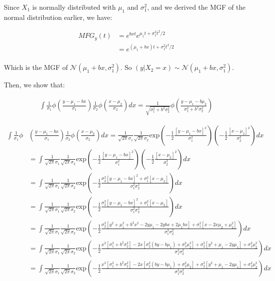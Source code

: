 \documentclass[11pt]{article}
\begin{document}
Since $X_1$ is normally distributed with $\mu_1$ and $\sigma^2_1$, and we derived the MGF of the normal distribution earlier, we have: 

\begin{align*}
    MFG_y(t) &= e^{bxt}e^{\mu_1t + \sigma_1^2t^2/2}\\
    &= e^{(\mu_1 + bx)t + \sigma_1^2t^2/2}\\
\end{align*}

Which is the MGF of $\mathcal{N}(\mu_1 + bx, \sigma^2_1)$. So $(y|X_2=x) \sim \mathcal{N}(\mu_1 + bx, \sigma^2_1) $.

Then, we show that:

\begin{align*}
    \int \frac{1}{\sigma_1} \phi \left( \frac{y-\mu_1-bx}{\sigma_1}\right)  \frac{1}{\sigma_2} \phi \left( \frac{x-\mu_2}{\sigma_2}\right)dx = \frac{1}{\sqrt{\sigma^2_1+b^2\sigma^2_2}} \phi \left( \frac{y-\mu_1-b\mu_2}{{\sigma^2_1+b^2\sigma^2_2}}\right)
\end{align*}


\begin{align*}
    \int \frac{1}{\sigma_1}  \phi & \left( \frac{y-\mu_1-bx}{\sigma_1}\right)  \frac{1}{\sigma_2} \phi \left( \frac{x-\mu_2}{\sigma_2}\right)dx = \frac{1}{\sqrt{2\pi}\sigma_1} \frac{1}{\sqrt{2\pi}\sigma_2} \text{exp}\left(-\frac{1}{2}\frac{[y-\mu_1-bx]^2}{\sigma^2_1}\right)\left(-\frac{1}{2}\frac{[x-\mu_2]^2}{\sigma_2^2}\right)dx\\
    &= \int\frac{1}{\sqrt{2\pi}\sigma_1} \frac{1}{\sqrt{2\pi}\sigma_2} \text{exp}\left(-\frac{1}{2}\frac{[y-\mu_1-bx]^2}{\sigma^2_1}\right)\left(-\frac{1}{2}\frac{[x-\mu_2]^2}{\sigma_2^2}\right)dx\\
     &= \int\frac{1}{\sqrt{2\pi}\sigma_1} \frac{1}{\sqrt{2\pi}\sigma_2} \text{exp}\left(-\frac{1}{2}\frac{\sigma^2_2[y-\mu_1-bx]^2+\sigma^2_1[x-\mu_2]}{\sigma^2_1\sigma^2_2}\right)dx\\
      &= \int\frac{1}{\sqrt{2\pi}\sigma_1} \frac{1}{\sqrt{2\pi}\sigma_2} \text{exp}\left(-\frac{1}{2}\frac{\sigma^2_2[y-\mu_1-bx]^2+\sigma^2_1[x-\mu_2]}{\sigma^2_1\sigma^2_2}\right)dx\\
      &= \int\frac{1}{\sqrt{2\pi}\sigma_1} \frac{1}{\sqrt{2\pi}\sigma_2} \text{exp}\left(-\frac{1}{2}\frac{\sigma^2_2[y^2 + \mu_1^2 + b^2x^2 - 2y\mu_1 - 2ybx + 2\mu_1bx]+\sigma^2_1[x-2x\mu_2 + \mu_2^2]}{\sigma^2_1\sigma^2_2}\right)dx\\
      & = \int\frac{1}{\sqrt{2\pi}\sigma_1} \frac{1}{\sqrt{2\pi}\sigma_2} \text{exp}\left(-\frac{1}{2}\frac{x^2[\sigma^2_1+b^2\sigma^2_2]-2x[\sigma^2_2(by-b\mu_1)+\sigma^2_1\mu^2_2] + \sigma^2_2[y^2+\mu_1-2y\mu_1]+\sigma^2_1\mu^2_2}{\sigma^2_1\sigma^2_2}\right)dx\\
         & = \int\frac{1}{\sqrt{2\pi}\sigma_1} \frac{1}{\sqrt{2\pi}\sigma_2} \text{exp}\left(-\frac{1}{2}\frac{x^2[\sigma^2_1+b^2\sigma^2_2]-2x[\sigma^2_2(by-b\mu_1)+\sigma^2_1\mu_2] + \sigma^2_2[y^2+\mu_1-2y\mu_1]+\sigma^2_1\mu_2^2}{\sigma^2_1\sigma^2_2}\right)dx
\end{align*}
\end{document}
